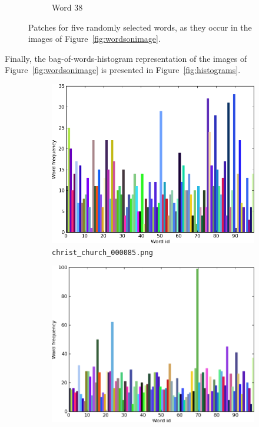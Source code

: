 \documentclass[a4paper,10pt,twoside]{article}
\begin{document}
\begin{figure}
\begin{subfigure}{0.49\textwidth}
    \caption{Word 38}
  \end{subfigure}
  \caption{Patches for five randomly selected words, as they occur in the images of Figure~\ref{fig:wordsonimage}.}
  \label{fig:words}
\end{figure}

Finally, the bag-of-words-histogram representation of the images of Figure~\ref{fig:wordsonimage} is presented in Figure~\ref{fig:histograms}.

\begin{figure}
  \begin{subfigure}{0.49\textwidth}
    \centering
    \includegraphics[width=\textwidth,height=.3\textheight,keepaspectratio]{histogram1}
    \caption{\texttt{christ\_church\_000085.png}}
  \end{subfigure}
  \begin{subfigure}{0.49\textwidth}
    \centering
    \includegraphics[width=\textwidth,height=.3\textheight,keepaspectratio]{histogram2}

\end{subfigure}
\end{figure}
\end{document}
